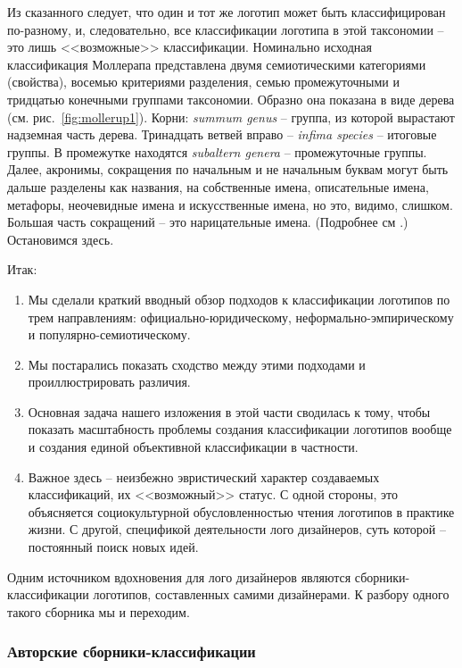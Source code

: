 Из сказанного следует, что один и тот же логотип может быть классифицирован по-разному, и,
следовательно, все классификации логотипа в этой таксономии -- это лишь <<возможные>>
классификации. Номинально исходная классификация Моллерапа представлена двумя семиотическими
категориями (свойства), восемью критериями разделения, семью промежуточными и тридцатью конечными
группами таксономии. Образно она показана в виде дерева (см. рис.~\ref{fig:mollerup1}). Корни: \emph{summum genus} -- группа, из которой вырастают надземная
часть дерева. Тринадцать ветвей вправо -- \emph{infima species} -- итоговые группы. В промежутке
находятся \emph{subaltern genera} -- промежуточные группы. Далее, акронимы, сокращения по начальным
и не начальным буквам могут быть дальше разделены как названия, на собственные имена, описательные
имена, метафоры, неочевидные имена и искусственные имена, но это, видимо, слишком. Большая часть
сокращений -- это нарицательные имена. (Подробнее см \autocite[][98-123]{mollerup1999marks}.)
Остановимся здесь.

Итак:
\begin{enumerate}
\item Мы сделали краткий вводный обзор подходов к классификации логотипов по трем направлениям:
  официально-юридическому, неформально-эмпирическому и популярно-семиотическому.
\item Мы постарались показать сходство между этими подходами и проиллюстрировать различия.
\item Основная задача нашего изложения в этой части сводилась к тому, чтобы показать масштабность
  проблемы создания классификации логотипов вообще и создания единой объективной классификации в
  частности.
\item Важное здесь -- неизбежно эвристический характер создаваемых классификаций, их <<возможный>>
  статус. С одной стороны, это объясняется социокультурной обусловленностью чтения логотипов в
  практике жизни. С другой, спецификой деятельности лого дизайнеров, суть которой -- постоянный поиск
  новых идей.
\end{enumerate}

Одним источником вдохновения для лого дизайнеров являются сборники-классификации логотипов,
составленных самими дизайнерами. К разбору одного такого сборника мы и переходим.

\subsubsection{Авторские сборники-классификации}
\label{2.2}

